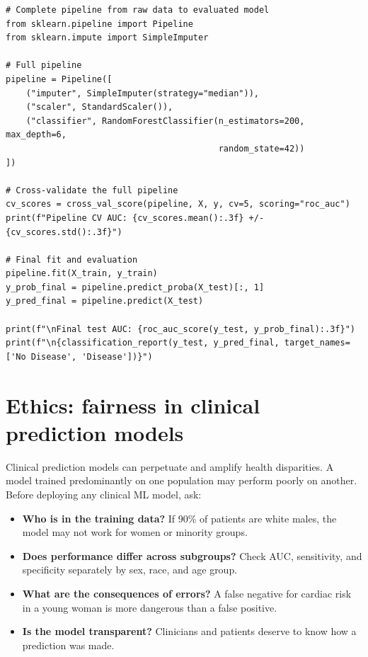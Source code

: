 \begin{verbatim}
# Complete pipeline from raw data to evaluated model
from sklearn.pipeline import Pipeline
from sklearn.impute import SimpleImputer

# Full pipeline
pipeline = Pipeline([
    ("imputer", SimpleImputer(strategy="median")),
    ("scaler", StandardScaler()),
    ("classifier", RandomForestClassifier(n_estimators=200, max_depth=6,
                                          random_state=42))
])

# Cross-validate the full pipeline
cv_scores = cross_val_score(pipeline, X, y, cv=5, scoring="roc_auc")
print(f"Pipeline CV AUC: {cv_scores.mean():.3f} +/- {cv_scores.std():.3f}")

# Final fit and evaluation
pipeline.fit(X_train, y_train)
y_prob_final = pipeline.predict_proba(X_test)[:, 1]
y_pred_final = pipeline.predict(X_test)

print(f"\nFinal test AUC: {roc_auc_score(y_test, y_prob_final):.3f}")
print(f"\n{classification_report(y_test, y_pred_final, target_names=['No Disease', 'Disease'])}")
\end{verbatim}

\section{Ethics: fairness in clinical prediction models}

\begin{warningbox}
Clinical prediction models can perpetuate and amplify health disparities. A model trained predominantly on one population may perform poorly on another. Before deploying any clinical ML model, ask:
\begin{itemize}
  \item \textbf{Who is in the training data?} If 90\% of patients are white males, the model may not work for women or minority groups.
  \item \textbf{Does performance differ across subgroups?} Check AUC, sensitivity, and specificity separately by sex, race, and age group.
  \item \textbf{What are the consequences of errors?} A false negative for cardiac risk in a young woman is more dangerous than a false positive.
  \item \textbf{Is the model transparent?} Clinicians and patients deserve to know how a prediction was made.
\end{itemize}
\end{warningbox}

